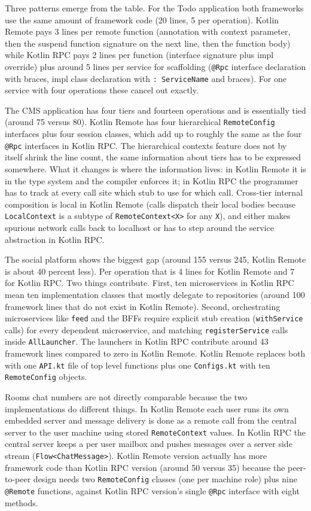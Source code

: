 \documentclass[a4paper,11pt,oneside]{article}
\newcommand{\kotlini}[1]{\texttt{#1}}
\begin{document}
Three patterns emerge from the table. For the Todo application both frameworks use the same
amount of framework code (20 lines, 5 per operation). Kotlin Remote pays 3 lines per remote
function (annotation with context parameter, then the suspend function signature on the next
line, then the function body) while Kotlin RPC pays 2 lines per function (interface signature
plus impl override) plus around 5 lines per service for scaffolding (\kotlini{@Rpc} interface
declaration with braces, impl class declaration with \kotlini{:~ServiceName} and braces). For
one service with four operations these cancel out exactly.

The CMS application has four tiers and fourteen operations and is essentially tied (around 75
versus 80). Kotlin Remote has four hierarchical \kotlini{RemoteConfig} interfaces plus four
session classes, which add up to roughly the same as the four \kotlini{@Rpc} interfaces in
Kotlin RPC. The hierarchical contexts feature does not by itself shrink the line count, the
same information about tiers has to be expressed somewhere. What it changes is where the
information lives: in Kotlin Remote it is in the type system and the compiler enforces it; in
Kotlin RPC the programmer has to track at every call site which stub to use for which call.
Cross-tier internal composition is local in Kotlin Remote (calls dispatch their local bodies
because \kotlini{LocalContext} is a subtype of \kotlini{RemoteContext<X>} for any \kotlini{X}),
and either makes spurious network calls back to localhost or has to step around the service
abstraction in Kotlin RPC.

The social platform shows the biggest gap (around 155 versus 245, Kotlin Remote is about 40
percent less). Per operation that is 4 lines for Kotlin Remote and 7 for Kotlin RPC. Two
things contribute. First, ten microservices in Kotlin RPC mean ten implementation classes that
mostly delegate to repositories (around 100 framework lines that do not exist in Kotlin
Remote). Second, orchestrating microservices like \kotlini{feed} and the BFFs require explicit
stub creation (\kotlini{withService} calls) for every dependent microservice, and matching
\kotlini{registerService} calls inside \kotlini{AllLauncher}. The launchers in Kotlin RPC
contribute around 43 framework lines compared to zero in Kotlin Remote. Kotlin Remote replaces
both with one \kotlini{API.kt} file of top level functions plus one \kotlini{Configs.kt} with
ten \kotlini{RemoteConfig} objects.

Rooms chat numbers are not directly comparable because the two implementations do different
things. In Kotlin Remote each user runs its own embedded server and message delivery is done
as a remote call from the central server to the user machine using stored
\kotlini{RemoteContext} values. In Kotlin RPC the central server keeps a per user mailbox and
pushes messages over a server side stream (\kotlini{Flow<ChatMessage>}). Kotlin Remote version
actually has more framework code than Kotlin RPC version (around 50 versus 35) because the
peer-to-peer design needs two \kotlini{RemoteConfig} classes (one per machine role) plus nine
\kotlini{@Remote} functions, against Kotlin RPC version's single \kotlini{@Rpc} interface with
eight methods.
\end{document}
